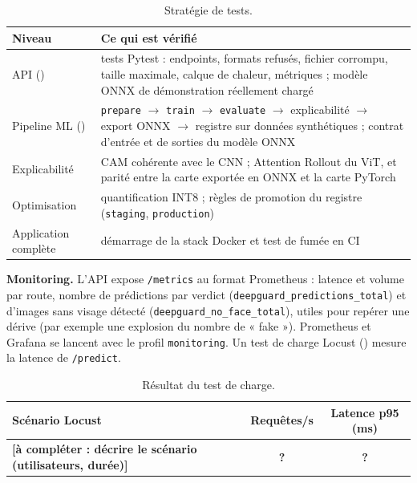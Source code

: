 \documentclass[11pt,a4paper]{article}
\newcommand{\aremplir}[1]{\textcolor{accent}{\textbf{[à compléter : #1]}}}
\newcommand{\ar}{\textcolor{accent}{\textbf{?}}}
\DeclareRobustCommand{\fichier}[1]{\texttt{\StrSubstitute{\detokenize{#1}}{/}{/\allowbreak}}}
\begin{document}
\begin{table}[H]
\centering\small
\begin{tabularx}{\textwidth}{@{}l>{\raggedright\arraybackslash}X@{}}
\toprule
\textbf{Niveau} & \textbf{Ce qui est vérifié} \\
\midrule
API (\fichier{backend/tests/}) & 12 tests Pytest : endpoints, formats refusés, fichier corrompu, taille maximale, calque de chaleur, métriques ; modèle ONNX de démonstration réellement chargé \\
Pipeline ML (\fichier{tests/}) & \texttt{prepare} $\rightarrow$ \texttt{train} $\rightarrow$ \texttt{evaluate} $\rightarrow$ explicabilité $\rightarrow$ export ONNX $\rightarrow$ registre sur données synthétiques ; contrat d'entrée et de sorties du modèle ONNX \\
Explicabilité & CAM cohérente avec le CNN ; Attention Rollout du ViT, et parité entre la carte exportée en ONNX et la carte PyTorch \\
Optimisation & quantification INT8 ; règles de promotion du registre (\texttt{staging}, \texttt{production}) \\
Application complète & démarrage de la stack Docker et test de fumée en CI \\
\bottomrule
\end{tabularx}
\caption{Stratégie de tests.}
\end{table}

\textbf{Monitoring.} L'API expose \texttt{/metrics} au format Prometheus : latence et volume par route, nombre de
prédictions par verdict (\texttt{deepguard\_predictions\_total}) et d'images sans visage détecté
(\texttt{deepguard\_no\_face\_total}), utiles pour repérer une dérive (par exemple une explosion du nombre de « fake »).
Prometheus et Grafana se lancent avec le profil \texttt{monitoring}. Un test de charge Locust
(\fichier{tests/load/locustfile.py}) mesure la latence de \texttt{/predict}.

\begin{table}[H]
\centering\small
\begin{tabular}{@{}lcc@{}}
\toprule
\textbf{Scénario Locust} & \textbf{Requêtes/s} & \textbf{Latence p95 (ms)} \\
\midrule
\aremplir{décrire le scénario (utilisateurs, durée)} & \ar & \ar \\
\bottomrule
\end{tabular}
\caption{Résultat du test de charge.}
\end{table}

\end{document}
